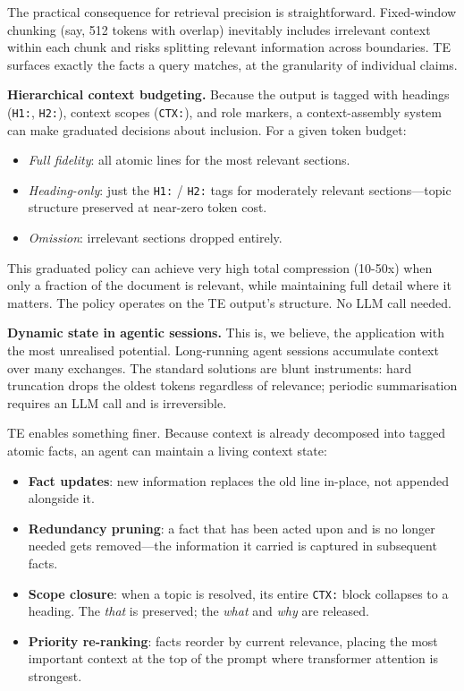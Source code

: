 \documentclass[
]{article}
\providecommand{\tightlist}{%
  \setlength{\itemsep}{0pt}\setlength{\parskip}{0pt}}
\begin{document}
The practical consequence for retrieval precision is straightforward.
Fixed-window chunking (say, 512 tokens with overlap) inevitably includes
irrelevant context within each chunk and risks splitting relevant
information across boundaries. TE surfaces exactly the facts a query
matches, at the granularity of individual claims.

\textbf{Hierarchical context budgeting.} Because the output is tagged
with headings (\texttt{H1:}, \texttt{H2:}), context scopes
(\texttt{CTX:}), and role markers, a context-assembly system can make
graduated decisions about inclusion. For a given token budget:

\begin{itemize}
\tightlist
\item
  \emph{Full fidelity}: all atomic lines for the most relevant sections.
\item
  \emph{Heading-only}: just the \texttt{H1:} / \texttt{H2:} tags for
  moderately relevant sections---topic structure preserved at near-zero
  token cost.
\item
  \emph{Omission}: irrelevant sections dropped entirely.
\end{itemize}

This graduated policy can achieve very high total compression (10-50x)
when only a fraction of the document is relevant, while maintaining full
detail where it matters. The policy operates on the TE output's
structure. No LLM call needed.

\textbf{Dynamic state in agentic sessions.} This is, we believe, the
application with the most unrealised potential. Long-running agent
sessions accumulate context over many exchanges. The standard solutions
are blunt instruments: hard truncation drops the oldest tokens
regardless of relevance; periodic summarisation requires an LLM call and
is irreversible.

TE enables something finer. Because context is already decomposed into
tagged atomic facts, an agent can maintain a living context state:

\begin{itemize}
\tightlist
\item
  \textbf{Fact updates}: new information replaces the old line in-place,
  not appended alongside it.
\item
  \textbf{Redundancy pruning}: a fact that has been acted upon and is no
  longer needed gets removed---the information it carried is captured in
  subsequent facts.
\item
  \textbf{Scope closure}: when a topic is resolved, its entire
  \texttt{CTX:} block collapses to a heading. The \emph{that} is
  preserved; the \emph{what} and \emph{why} are released.
\item
  \textbf{Priority re-ranking}: facts reorder by current relevance,
  placing the most important context at the top of the prompt where
  transformer attention is strongest.
\end{itemize}
\end{document}
